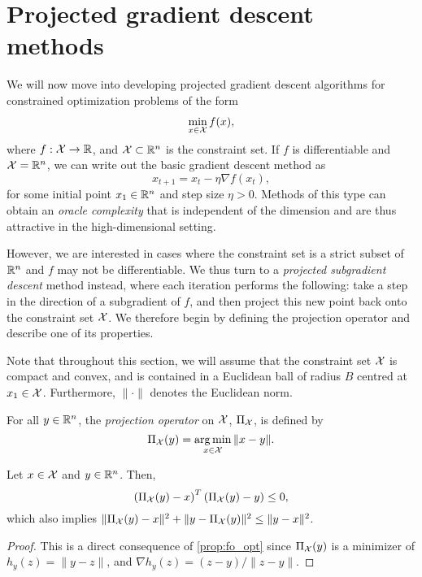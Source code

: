 \section{Projected gradient descent methods}
We will now move into developing projected gradient descent algorithms for constrained optimization problems of the form 
\begin{align*}
\min_{x \in \mathcal{X}} f(x),
\end{align*}
where $f : \mathcal{X} \rightarrow \mathbb{R}$, and $\mathcal{X} \subset \mathbb{R}^n$ is the constraint set. If $f$ is differentiable and $\mathcal{X} = \mathbb{R}^n$, we can write out the basic gradient descent method as 
\[
x_{t+1} = x_t - \eta \nabla f(x_t),
\]
for some initial point $x_1 \in \mathbb{R}^n$ and step size $\eta > 0$. Methods of this type can obtain an \emph{oracle complexity} that is independent of the dimension and are thus attractive in the high-dimensional setting. 

However, we are interested in cases where the constraint set is a strict subset of $\mathbb{R}^n$ and $f$ may not be differentiable. We thus turn to a \emph{projected subgradient descent} method instead, where each iteration performs the following: take a step in the direction of a subgradient of $f$, and then project this new point back onto the constraint set $\mathcal{X}$. We therefore begin by defining the projection operator and describe one of its properties.

Note that throughout this section, we will assume that the constraint set $\mathcal{X}$ is compact and convex, and is contained in a Euclidean ball of radius $B$ centred at $x_1 \in \mathcal{X}$. Furthermore, $\| \cdot \|$ denotes the Euclidean norm.

\begin{definition}
For all $y \in \mathbb{R}^n$, the \emph{projection operator} on $\mathcal{X}$, $\Pi_{\mathcal{X}}$, is defined by 
\[
\Pi_{\mathcal{X}}(y) = \operatorname*{arg\,min}_{x \in \mathcal{X}} \| x - y \|.
\]
\end{definition}

\begin{lemma} \label{lem:proj_grad}
Let $x \in \mathcal{X}$ and $y \in \mathbb{R}^n$. Then, 
\[
\left(\Pi_{\mathcal{X}}(y) - x\right)^T \left(\Pi_{\mathcal{X}}(y) - y\right) \leq 0,
\]
which also implies $\|\Pi_{\mathcal{X}}(y) - x\|^2 + \|y - \Pi_{\mathcal{X}}(y)\|^2 \leq \|y - x\|^2$. 
\begin{proof}
This is a direct consequence of \autoref{prop:fo_opt} since $\Pi_{\mathcal{X}}(y)$ is a minimizer of $h_{y}(z) = \| y - z \|$, and $\nabla h_y(z) = (z - y) / \|z - y \|$.
\end{proof}
\end{lemma}

